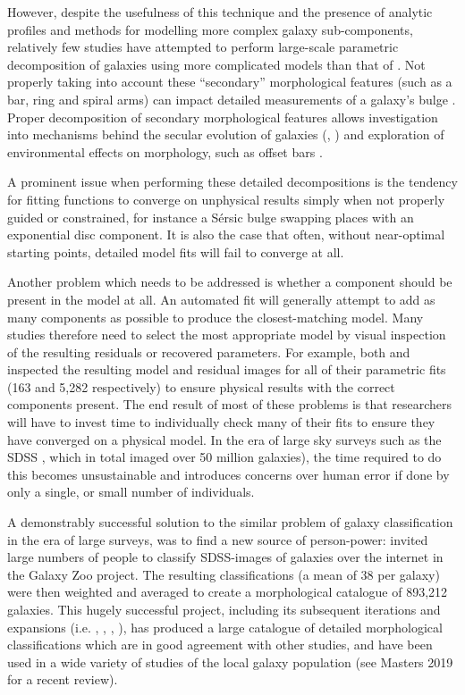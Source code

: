 \documentclass[../main.tex]{subfiles}
\begin{document}
However, despite the usefulness of this technique and the presence of analytic profiles and methods for modelling more complex galaxy sub-components, relatively few studies have attempted to perform large-scale parametric decomposition of galaxies using more complicated models than that of \citet{2011ApJS..196...11S}. Not properly taking into account these ``secondary'' morphological features (such as a bar, ring and spiral arms) can impact detailed measurements of a galaxy's bulge \citep{Gao2017:1709.00746v1}. Proper decomposition of secondary morphological features allows investigation into mechanisms behind the secular evolution of galaxies (\citealt{2018MNRAS.473.4731K}, \citealt{2018ApJ...862..100G}) and exploration of environmental effects on morphology, such as offset bars \citep{2017MNRAS.469.3363K}.

A prominent issue when performing these detailed decompositions is the tendency for fitting functions to converge on unphysical results simply when not properly guided or constrained, for instance a S\'ersic bulge swapping places with an exponential disc component. It is also the case that often, without near-optimal starting points, detailed model fits will fail to converge at all.

Another problem which needs to be addressed is whether a component should be present in the model at all. An automated fit will generally attempt to add as many components as possible to produce the closest-matching model. Many studies therefore need to select the most appropriate model by visual inspection of the resulting residuals or recovered parameters. For example, both \citet{Vika2014:1408.4070v1} and \citet{2018MNRAS.473.4731K} inspected the resulting model and residual images for all of their parametric fits (163 and 5,282 respectively) to ensure physical results with the correct components present. The end result of most of these problems is that researchers will have to invest time to individually check many of their fits to ensure they have converged on a physical model. In the era of large sky surveys such as the SDSS \citep{SDSSDR7}, which in total imaged over 50 million galaxies), the time required to do this becomes unsustainable and introduces concerns over human error if done by only a single, or small number of individuals.

A demonstrably successful solution to the similar problem of galaxy classification in the era of large surveys, was to find a new source of person-power: \cite{Lintott2008:0804.4483v1} invited large numbers of people to classify SDSS-images of galaxies over the internet in the Galaxy Zoo project. The resulting classifications (a mean of 38 per galaxy) were then weighted and averaged to create a morphological catalogue of 893,212 galaxies. This hugely successful project, including its subsequent iterations and expansions (i.e. \citealt{Willett2013:1308.3496v2}, \citealt{2017MNRAS.464.4176W}, \citealt{2017MNRAS.464.4420S}, \citealt{Hart2016:1607.01019v1}), has produced a large catalogue of detailed morphological classifications which are in good agreement with other studies, and have been used in a wide variety of studies of the local galaxy population (see  Masters 2019 for a recent review).
\end{document}
